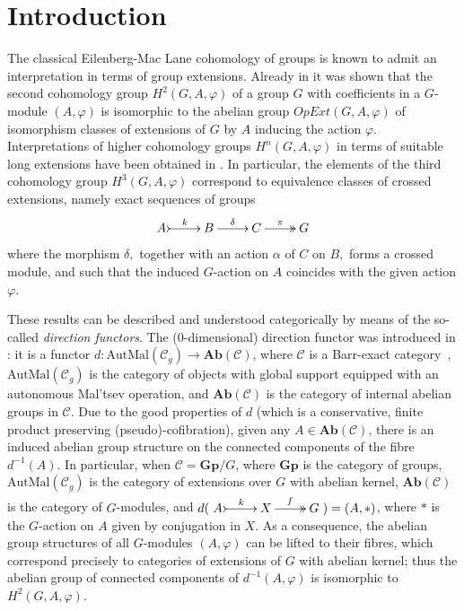 \documentclass[a4paper]{amsart}
\theoremstyle{plain}
\theoremstyle{definition}
\theoremstyle{remark}
\begin{document}


\maketitle
\section{Introduction}
The classical Eilenberg-Mac Lane cohomology of groups \cite{EML} is known to admit an interpretation in terms of group extensions. Already in \cite{EML} it was shown that the second cohomology group $H^2(G, A, \varphi)$ of a group $G$ with coefficients in a $G$-module $(A, \varphi)$ is isomorphic to the abelian group $OpExt(G, A, \varphi)$ of isomorphism classes of extensions of $G$ by $A$ inducing the action $\varphi.$ Interpretations of higher cohomology groups $H^n(G, A, \varphi)$ in terms of suitable long extensions have been obtained in \cite{Holt, Huebschmann}. In particular, the elements of the third cohomology group $H^3(G, A, \varphi)$ correspond to equivalence classes of crossed extensions, namely exact sequences of groups
\[ \xymatrix{
A \ar@{>->}[r]^-k &B \ar[r]^-{\delta} &C \ar@{->>}[r]^-{\pi} &G
} \]
where the morphism $\delta,$ together with an action $\alpha$ of $C$ on $B,$ forms a crossed module, and such that the induced $G$-action on $A$ coincides with the given action $\varphi.$

These results can be described and understood categorically by means of the so-called \emph{direction functors}. The ($0$-dimensional) direction functor was introduced in \cite{bourn-direction}: it is a functor $d\colon \mathrm{AutMal}({\mathcal{C}}_g)\to\mathbf{Ab}(\mathcal{C})$, where $\mathcal{C}$ is a Barr-exact category~\cite{barr}, $\mathrm{AutMal}({\mathcal{C}}_g)$ is the category of objects with global support equipped with an autonomous Mal'tsev operation, and $\mathbf{Ab}(\mathcal{C})$ is the category of internal abelian groups in $\mathcal{C}$. Due to the good properties of $d$ (which is a conservative, finite product preserving (pseudo)-cofibration), given any $A\in \mathbf{Ab}(\mathcal{C})$, there is an induced abelian group structure on the connected components of the fibre $d^{-1}(A)$. In particular, when $\mathcal{C}=\mathbf{Gp}/G$, where $\mathbf{Gp}$ is the category of groups, $\mathrm{AutMal}({\mathcal{C}}_g)$ is the category of extensions over $G$ with abelian kernel, $\mathbf{Ab}(\mathcal{C})$ is the category of $G$-modules, and $d(\xymatrix@R=10pt{A \ar@{>->}[r]^-k & X \ar@{>>}[r]^f & G})=(A,\ast)$, where $\ast$ is the $G$-action on $A$ given by conjugation in $X$. As a consequence, the abelian group structures of all $G$-modules $(A,\varphi)$ can be lifted to their fibres, which correspond precisely to categories of extensions of $G$ with abelian kernel; thus the abelian group of connected components of $d^{-1}(A,\varphi)$ is isomorphic to $H^2(G,A,\varphi)$.
\end{document}

